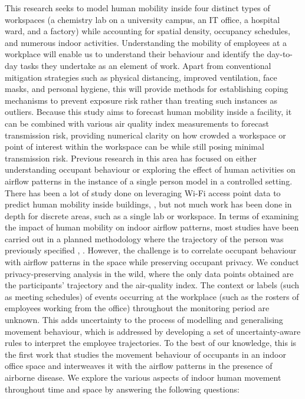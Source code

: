 \documentclass[acmtog]{acmart}
\begin{document}
This research seeks to model human mobility inside four distinct types of workspaces (a chemistry lab on a university campus, an IT office, a hospital ward, and a factory) while accounting for spatial density, occupancy schedules, and numerous indoor activities. Understanding the mobility of employees at a workplace will enable us to understand their behaviour and identify the day-to-day tasks they undertake as an element of work. Apart from conventional mitigation strategies such as physical distancing, improved ventilation, face masks, and personal hygiene, this will provide methods for establishing coping mechanisms to prevent exposure risk rather than treating such instances as outliers. Because this study aims to forecast human mobility inside a facility, it can be combined with various air quality index measurements to forecast transmission risk, providing numerical clarity on how crowded a workspace or point of interest within the workspace can be while still posing minimal transmission risk. Previous research in this area has focused on either understanding occupant behaviour or exploring the effect of human activities on airflow patterns in the instance of a single person model in a controlled setting. There has been a lot of study done on leveraging Wi-Fi access point data to predict human mobility inside buildings,  \cite{qian2016decimeter}, \cite{meneses2012large} but not much work has been done in depth for discrete areas, such as a single lab or workspace. In terms of examining the impact of human mobility on indoor airflow patterns, most studies have been carried out in a planned methodology where the trajectory of the person was previously specified \cite{mahaki2021comparing}, \cite{wu2022transient}. However, the challenge is to correlate occupant behaviour with airflow patterns in the space while preserving occupant privacy. We conduct privacy-preserving analysis in the wild, where the only data points obtained are the participants' trajectory and the air-quality index. The context or labels (such as meeting schedules) of events occurring at the workplace (such as the rosters of employees working from the office) throughout the monitoring period are unknown. This adds uncertainty to the process of modelling and generalising movement behaviour, which is addressed by developing a set of uncertainty-aware rules to interpret the employee trajectories. To the best of our knowledge, this is the first work that studies the movement behaviour of occupants in an indoor office space and interweaves it with the airflow patterns in the presence of airborne disease. We explore the various aspects of indoor human movement throughout time and space by answering the following questions:
\end{document}
